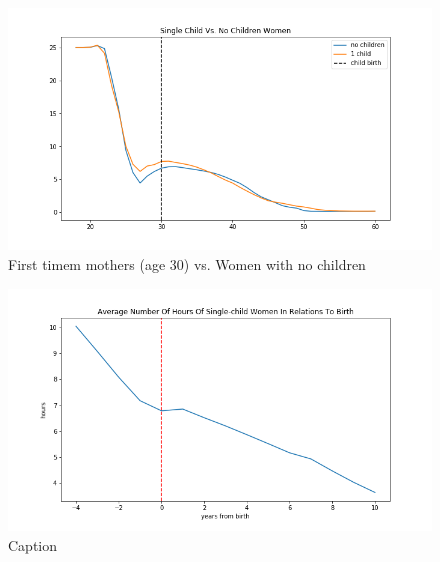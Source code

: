 \begin{figure}
    \centering
    \includegraphics[scale=0.6]{figures/dqi_single_child_vs_no_child_model1.png}
    \caption{First timem mothers (age 30) vs. Women with no children}
    \label{fig:dqi_model1_child_vs_no_child_30}
\end{figure}

\begin{figure}
    \centering
    \includegraphics[scale=0.6]{figures/women_supplied_hours_dqi_model1_birth_onset.png}
    \caption{Caption}
    \label{fig:dqi_model1_birth_onset}
\end{figure}

